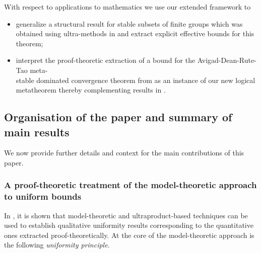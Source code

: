 \documentclass[11pt]{amsart}
\theoremstyle{definition}
\theoremstyle{remark}
\begin{document}
With respect to applications to mathematics we use our extended framework to

\begin{itemize}
\item
  generalize a structural result for stable subsets of finite groups
  which was obtained using ultra-methods in \cite{conant2020group}
  and extract
  explicit effective bounds for this theorem;
\item
  interpret the proof-theoretic extraction of a bound for the
  Avigad-Dean-Rute-Tao meta-\\ stable dominated convergence theorem
  from \cite{Avigad-Dean-Rute:Dominated:12} as an instance of our
  new logical metatheorem thereby complementing results in
  \cite{neri-pischke:24:formal:pub}.
\end{itemize}



 
\subsection{Organisation of the paper and summary of main results}
\label{subsec:organisation}

We now provide further details and context for the main contributions of this paper. 
\subsubsection{A proof-theoretic treatment of the model-theoretic approach to uniform bounds}


In \cite{avigad2013ultraproducts}, it is shown that model-theoretic and ultraproduct-based techniques can be used to establish qualitative uniformity results corresponding to the quantitative ones extracted proof-theoretically. At the core of the model-theoretic approach is the following \emph{uniformity principle}.
\end{document}
